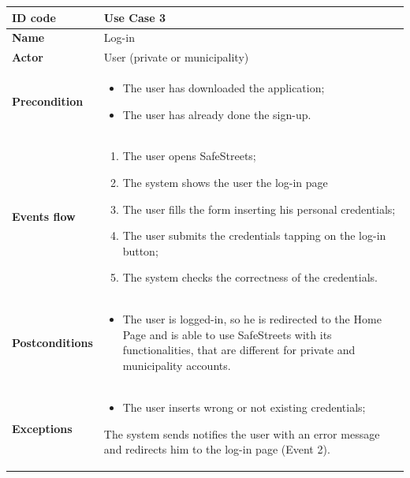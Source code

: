 \documentclass[titlepage]{article}
\begin{document}
\begin{longtable}{| p{3 cm} | p{10 cm} |} 
\hline


\textbf{ID code} & Use Case 3 \\ \hline
\textbf{Name} & Log-in \\ \hline
\textbf{Actor} & User (private or municipality) \\ \hline
\textbf{Precondition} & 
\begin{itemize}
\item The user has downloaded the application;
\item The user has already done the sign-up.
\end{itemize} \\ \hline

\textbf{Events flow} & 
\begin{enumerate}
\item The user opens SafeStreets;
\item The system shows the user the log-in page
\item The user fills the form inserting his personal credentials;
\item The user submits the credentials tapping on the log-in button;
\item The system checks the correctness of the credentials.
\end{enumerate} \\ \hline

\textbf{Postconditions} & 
\begin{itemize}
\item The user is logged-in, so he is redirected to the Home Page and is able to use SafeStreets with its functionalities, that are different for private and municipality accounts. 
\end{itemize} \\ \hline

\textbf{Exceptions} &
\begin{itemize}
\item The user inserts wrong or not existing credentials;
\end{itemize}
The system sends notifies the user with an error message and redirects him to the log-in page (Event 2).
\\ \hline

\end{longtable}

\newpage
\end{document}
